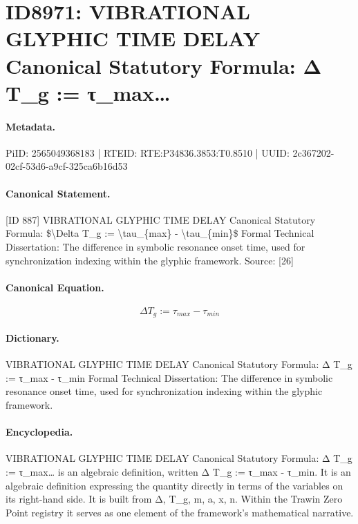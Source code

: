 \section*{ID8971: VIBRATIONAL GLYPHIC TIME DELAY Canonical Statutory Formula: Δ T\_g := τ\_max…}
\paragraph{Metadata.}
PiID: 2565049368183 | RTEID: RTE:P34836.3853:T0.8510 | UUID: 2c367202-02cf-53d6-a9cf-325ca6b16d53

\paragraph{Canonical Statement.}
[ID 887] VIBRATIONAL GLYPHIC TIME DELAY Canonical Statutory Formula: \$\textbackslash{}Delta T\_g := \textbackslash{}tau\_\{max\} - \textbackslash{}tau\_\{min\}\$ Formal Technical Dissertation: The difference in symbolic resonance onset time, used for synchronization indexing within the glyphic framework. Source: [26]

\paragraph{Canonical Equation.}
\[
\Delta T_g := \tau_{max} - \tau_{min}
\]

\paragraph{Dictionary.}
VIBRATIONAL GLYPHIC TIME DELAY Canonical Statutory Formula: Δ T\_g := τ\_max - τ\_min Formal Technical Dissertation: The difference in symbolic resonance onset time, used for synchronization indexing within the glyphic framework.

\paragraph{Encyclopedia.}
VIBRATIONAL GLYPHIC TIME DELAY Canonical Statutory Formula: Δ T\_g := τ\_max… is an algebraic definition, written Δ T\_g := τ\_max - τ\_min. It is an algebraic definition expressing the quantity directly in terms of the variables on its right-hand side. It is built from Δ, T\_g, m, a, x, n. Within the Trawin Zero Point registry it serves as one element of the framework's mathematical narrative.
